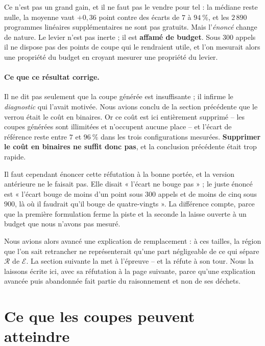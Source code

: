 \documentclass[11pt,a4paper]{article}
\theoremstyle{plain}
\theoremstyle{remark}
\newcommand{\Ecal}{\mathcal{E}}
\newcommand{\Rcal}{\mathcal{R}}
\begin{document}
Ce n'est pas un grand gain, et il ne faut pas le vendre pour tel : la
médiane reste nulle, la moyenne vaut $+0{,}36$ point contre des écarts de
$7$ à $94\ \%$, et les $2\,890$ programmes linéaires supplémentaires ne sont
pas gratuits. Mais l'\emph{énoncé} change de nature. Le levier n'est pas
inerte ; il est \textbf{affamé de budget}. Sous $300$ appels il ne dispose
pas des points de coupe qui le rendraient utile, et l'on mesurait alors une
propriété du budget en croyant mesurer une propriété du levier.

\paragraph{Ce que ce résultat corrige.} Il ne dit pas seulement que la coupe
générée est insuffisante ; il infirme le \emph{diagnostic} qui l'avait
motivée. Nous avions conclu de la section précédente que le verrou était le
coût en binaires. Or ce coût est ici entièrement supprimé -- les coupes
générées sont illimitées et n'occupent aucune place -- et l'écart de
référence reste entre $7$ et $96\ \%$ dans les trois configurations
mesurées. \textbf{Supprimer le coût en binaires ne suffit donc pas}, et la
conclusion précédente était trop rapide.

Il faut cependant énoncer cette réfutation à la bonne portée, et la version
antérieure ne le faisait pas. Elle disait « l'écart ne bouge pas » ; le
juste énoncé est « l'écart bouge de moins d'un point sous $300$ appels et de
moins de cinq sous $900$, là où il faudrait qu'il bouge de quatre-vingts ».
La différence compte, parce que la première formulation ferme la piste et la
seconde la laisse ouverte à un budget que nous n'avons pas mesuré.

Nous avions alors avancé une explication de remplacement : à ces tailles, la
région que l'on sait retrancher ne représenterait qu'une part négligeable de
ce qui sépare $\Rcal$ de $\Ecal$. La section suivante la met à l'épreuve --
et la réfute à son tour. Nous la laissons écrite ici, avec sa réfutation à la
page suivante, parce qu'une explication avancée puis abandonnée fait partie
du raisonnement et non de ses déchets.

\section{Ce que les coupes peuvent atteindre}
\label{sec:couverture}
\end{document}
